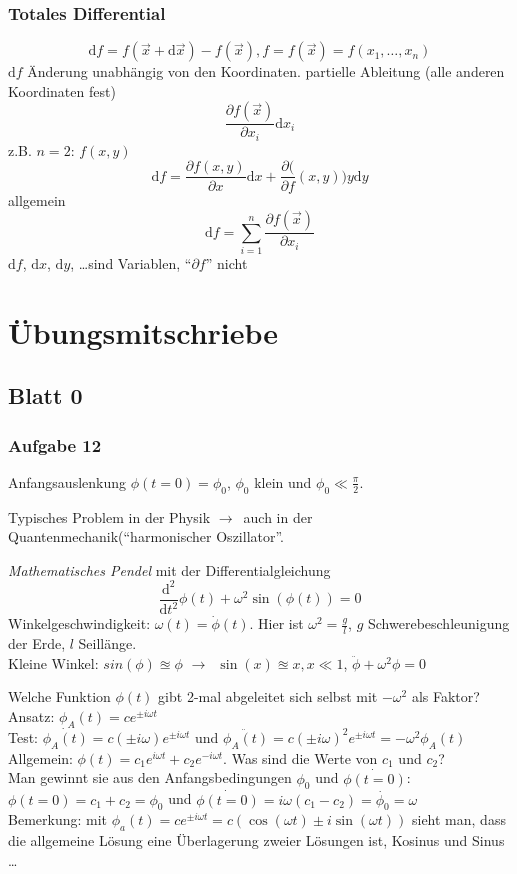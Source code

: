 \documentclass[oneside]{book}
\theoremstyle{definition}
\newcommand{\conseq}{$\rightarrow$~}
\newcommand{\QM}{Quantenmechanik}
\newcommand{\Dgl}{Differentialgleichung}
\renewcommand{\d}{\mathrm d}
\newcommand{\ffpartial}[2]{\frac{\partial #1}{\partial #2}}
\begin{document}
\subsection{Totales Differential}
$$\d f = f(\vec{x} + \d \vec{x}) - f(\vec{x}), f = f(\vec{x}) = f(x_1, \dots, x_n)$$
$\d f$ Änderung unabhängig von den Koordinaten.
partielle Ableitung (alle anderen Koordinaten fest)
$$\ffpartial{f(\vec{x})}{x_i} \d x_i$$
z.B. $n = 2$: $f (x, y)$
$$\d f = \ffpartial{f(x,y)}{x} \d x + \ffpartial(f(x,y)){y} \d y$$
allgemein
$$\d f = \sum_{i=1}^n \ffpartial{f(\vec{x})}{x_i}$$
$\d f$, $\d x$, $\d y$, \dots sind Variablen, "`$\partial f$"' nicht

\chapter{Übungsmitschriebe}

\section{Blatt 0}
\subsection{Aufgabe 12}
Anfangsauslenkung $\phi(t = 0) = \phi_0$, $\phi_0$ klein und $\phi_0 \ll \frac{\pi}{2}$.

Typisches Problem in der Physik \conseq auch in der \QM ("`harmonischer Oszillator"'.
 
\textit{Mathematisches Pendel} mit der \Dgl
$$ \frac{\d^2}{\d t^2} \phi(t) + \omega^2 \sin(\phi(t)) = 0$$
Winkelgeschwindigkeit: $\omega(t) = \dot\phi(t)$. Hier ist $\omega^2 = \frac{g}{l}$, $g$ Schwerebeschleunigung der Erde, $l$ Seillänge.\\
Kleine Winkel: $sin(\phi) \approxeq \phi$ \conseq $\sin(x) \approxeq x, x \ll 1$, $\ddot{\phi} + \omega^2 \phi = 0$

Welche Funktion $\phi(t)$ gibt 2-mal abgeleitet sich selbst mit $-\omega^2$ als Faktor?\\
Ansatz: $\phi_A(t) = c e^{\pm i \omega t}$\\
Test: $\dot{\phi_A(t)} = c (\pm i \omega) e^{\pm i \omega t}$ und $\ddot{\phi_A(t)} = c (\pm i \omega)^2 e^{\pm i \omega t} = - \omega^2 \phi_A(t)$\\
Allgemein: $\phi(t) = c_1 e^{i \omega t} + c_2 e^{- i \omega t}$. Was sind die Werte von $c_1$ und $c_2$?\\
Man gewinnt sie aus den Anfangsbedingungen $\phi_0$ und $\dot{\phi(t = 0)}$: $\phi(t = 0) = c_1 + c_2 = \phi_0$ und $\dot{\phi(t = 0)} = i \omega (c_1 - c_2) = \dot{\phi_0} = \omega$\\
Bemerkung: mit $\phi_a(t) = c e^{\pm i \omega t} = c (\cos(\omega t) \pm i \sin(\omega t))$ sieht man, dass die allgemeine Lösung eine Überlagerung zweier Lösungen ist, Kosinus und Sinus \dots
\end{document}
